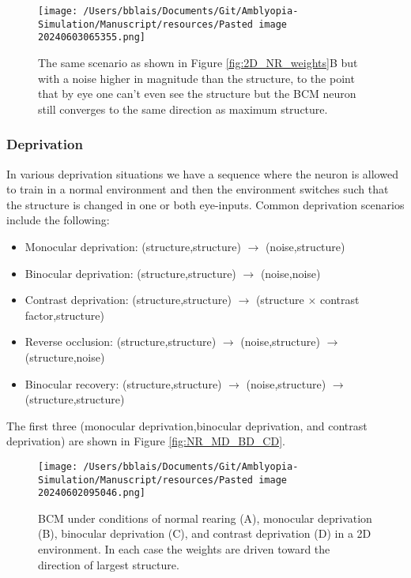 \documentclass[
]{article}
\providecommand{\tightlist}{%
  \setlength{\itemsep}{0pt}\setlength{\parskip}{0pt}}
\begin{document}
\begin{figure}
\centering
\texttt{[image: /Users/bblais/Documents/Git/Amblyopia-Simulation/Manuscript/resources/Pasted image 20240603065355.png]}
\caption{The same scenario as shown in Figure \ref{fig:2D_NR_weights}B
but with a noise higher in magnitude than the structure, to the point
that by eye one can't even see the structure but the BCM neuron still
converges to the same direction as maximum
structure.}\label{fig:2D_NR_high_noise}
\end{figure}

\subsubsection{Deprivation}\label{sec:deprivation}

In various deprivation situations we have a sequence where the neuron is
allowed to train in a normal environment and then the environment
switches such that the structure is changed in one or both eye-inputs.
Common deprivation scenarios include the following:

\begin{itemize}
\tightlist
\item
  Monocular deprivation: (structure,structure) \(\rightarrow\)
  (noise,structure)
\item
  Binocular deprivation: (structure,structure) \(\rightarrow\)
  (noise,noise)
\item
  Contrast deprivation: (structure,structure) \(\rightarrow\) (structure
  \(\times\) contrast factor,structure)
\item
  Reverse occlusion: (structure,structure) \(\rightarrow\)
  (noise,structure) \(\rightarrow\) (structure,noise)
\item
  Binocular recovery: (structure,structure) \(\rightarrow\)
  (noise,structure) \(\rightarrow\) (structure,structure)
\end{itemize}

The first three (monocular deprivation,binocular deprivation, and
contrast deprivation) are shown in Figure \ref{fig:NR_MD_BD_CD}.

\begin{figure}
\centering
\texttt{[image: /Users/bblais/Documents/Git/Amblyopia-Simulation/Manuscript/resources/Pasted image 20240602095046.png]}
\caption{BCM under conditions of normal rearing (A), monocular
deprivation (B), binocular deprivation (C), and contrast deprivation (D)
in a 2D environment. In each case the weights are driven toward the
direction of largest
structure.}\label{fig:Pasted_image_20240602095046.png}
\end{figure}
\end{document}
